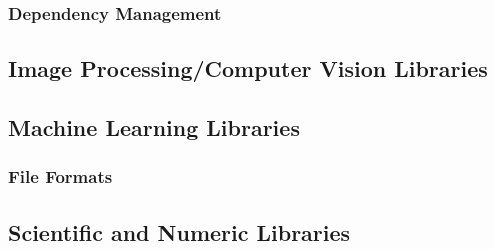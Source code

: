 \subsubsection{Dependency Management}


\subsection{Image Processing/Computer Vision Libraries}


\subsection{Machine Learning Libraries}

\subsubsection{File Formats}


\subsection{Scientific and Numeric Libraries}


